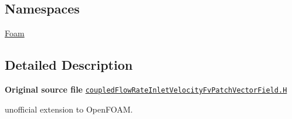 \subsection*{Namespaces}
\begin{DoxyCompactItemize}
\item 
 \hyperlink{namespaceFoam}{Foam}
\end{DoxyCompactItemize}


\subsection{Detailed Description}
{\bfseries Original source file} \href{../../../home/carlo/data/GeN-Foam/GeN-Foam_ffn/GeN-Foam/GeN-Foam/FMU4FOAM/ECI4FOAM/src/externalComm/externalIO/input/BC/coupledFlowRateInletVelocity/coupledFlowRateInletVelocityFvPatchVectorField.H}{\tt coupled\+Flow\+Rate\+Inlet\+Velocity\+Fv\+Patch\+Vector\+Field.\+H}

\begin{DoxyVerb}unofficial extension to OpenFOAM.\end{DoxyVerb}
